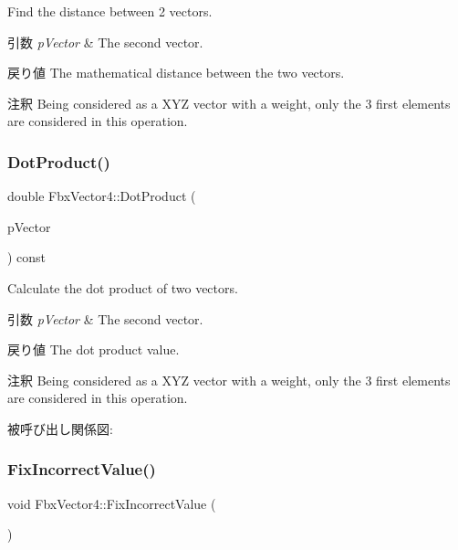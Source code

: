 Find the distance between 2 vectors. 
\begin{DoxyParams}{引数}
{\em p\+Vector} & The second vector. \\
\hline
\end{DoxyParams}
\begin{DoxyReturn}{戻り値}
The mathematical distance between the two vectors. 
\end{DoxyReturn}
\begin{DoxyRemark}{注釈}
Being considered as a X\+YZ vector with a weight, only the 3 first elements are considered in this operation. 
\end{DoxyRemark}
\mbox{\label{class_fbx_vector4_adef4af04dc2011fb6553fad79d445ed0}} 
\subsubsection{\texorpdfstring{Dot\+Product()}{DotProduct()}}
{\footnotesize\ttfamily double Fbx\+Vector4\+::\+Dot\+Product (\begin{DoxyParamCaption}\item[{const \hyperlink{class_fbx_vector4}{Fbx\+Vector4} \&}]{p\+Vector }\end{DoxyParamCaption}) const}

Calculate the dot product of two vectors. 
\begin{DoxyParams}{引数}
{\em p\+Vector} & The second vector. \\
\hline
\end{DoxyParams}
\begin{DoxyReturn}{戻り値}
The dot product value. 
\end{DoxyReturn}
\begin{DoxyRemark}{注釈}
Being considered as a X\+YZ vector with a weight, only the 3 first elements are considered in this operation. 
\end{DoxyRemark}
被呼び出し関係図\+:
\mbox{\label{class_fbx_vector4_adb1810b99d85ab324cfe837fb286dcd2}} 
\subsubsection{\texorpdfstring{Fix\+Incorrect\+Value()}{FixIncorrectValue()}}
{\footnotesize\ttfamily void Fbx\+Vector4\+::\+Fix\+Incorrect\+Value (\begin{DoxyParamCaption}{ }\end{DoxyParamCaption})}

